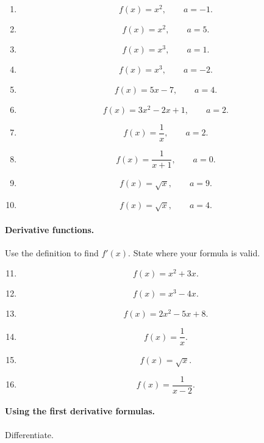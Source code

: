 \begin{enumerate}
\item
\[
f(x)=x^2,\qquad a=-1.
\]

\item
\[
f(x)=x^2,\qquad a=5.
\]

\item
\[
f(x)=x^3,\qquad a=1.
\]

\item
\[
f(x)=x^3,\qquad a=-2.
\]

\item
\[
f(x)=5x-7,\qquad a=4.
\]

\item
\[
f(x)=3x^2-2x+1,\qquad a=2.
\]

\item
\[
f(x)=\frac1x,\qquad a=2.
\]

\item
\[
f(x)=\frac1{x+1},\qquad a=0.
\]

\item
\[
f(x)=\sqrt{x},\qquad a=9.
\]

\item
\[
f(x)=\sqrt{x},\qquad a=4.
\]
\end{enumerate}

\paragraph{Derivative functions.}
Use the definition to find \(f'(x)\).  State where your formula is valid.

\begin{enumerate}
\setcounter{enumi}{10}

\item
\[
f(x)=x^2+3x.
\]

\item
\[
f(x)=x^3-4x.
\]

\item
\[
f(x)=2x^2-5x+8.
\]

\item
\[
f(x)=\frac1x.
\]

\item
\[
f(x)=\sqrt{x}.
\]

\item
\[
f(x)=\frac{1}{x-2}.
\]
\end{enumerate}

\paragraph{Using the first derivative formulas.}
Differentiate.

